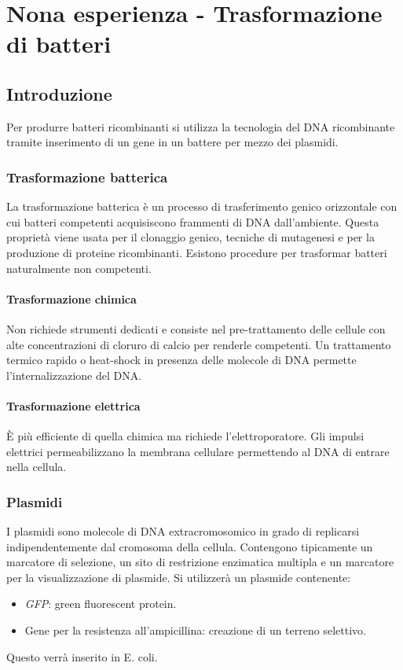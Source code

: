 \section{Nona esperienza - Trasformazione di batteri}

	\subsection{Introduzione}
	Per produrre batteri ricombinanti si utilizza la tecnologia del DNA ricombinante tramite inserimento di un gene in un battere per mezzo dei plasmidi.

		\subsubsection{Trasformazione batterica}
		La trasformazione batterica \`e un processo di trasferimento genico orizzontale con cui batteri competenti acquisiscono frammenti di DNA dall'ambiente.
		Questa propriet\`a viene usata per il clonaggio genico, tecniche di mutagenesi e per la produzione di proteine ricombinanti.
		Esistono procedure per trasformar batteri naturalmente non competenti.

			\paragraph{Trasformazione chimica}
			Non richiede strumenti dedicati e consiste nel pre-trattamento delle cellule con alte concentrazioni di cloruro di calcio per renderle competenti.
			Un trattamento termico rapido o heat-shock in presenza delle molecole di DNA permette l'internalizzazione del DNA.

			\paragraph{Trasformazione elettrica}
			\`E pi\`u efficiente di quella chimica ma richiede l'elettroporatore.
			Gli impulsi elettrici permeabilizzano la membrana cellulare permettendo al DNA di entrare nella cellula.

		\subsubsection{Plasmidi}
		I plasmidi sono molecole di DNA extracromosomico in grado di replicarsi indipendentemente dal cromosoma della cellula.
		Contengono tipicamente un marcatore di selezione, un sito di restrizione enzimatica multipla e un marcatore per la visualizzazione di plasmide.
		Si utilizzer\`a un plasmide contenente:
		\begin{multicols}{2}
			\begin{itemize}
				\item \emph{GFP}: green fluorescent protein.
				\item Gene per la resistenza all'ampicillina: creazione di un terreno selettivo.
			\end{itemize}
		\end{multicols}
		Questo verr\`a inserito in E. coli.

